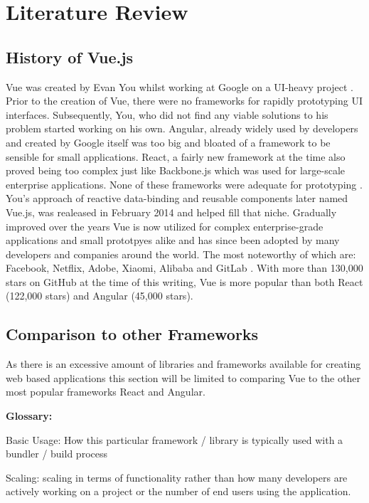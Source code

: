 \chapter[Literature Review]{Literature Review}

\section{History of Vue.js}
Vue was created by Evan You whilst working at Google on a UI-heavy project \cite{macrae2018vue}. Prior to the creation of Vue, there were no frameworks for rapidly prototyping UI interfaces. Subsequently, You, who did not find any viable solutions to his problem started working on his own. Angular, already widely used by developers and created by Google itself was too big and bloated of a framework to be sensible for small applications. React, a fairly new framework at the time also proved being too complex just like Backbone.js which was used for large-scale enterprise applications. None of these frameworks were adequate for prototyping \cite[p.~10]{filipova2016learning}. You's approach of reactive data-binding and reusable components later named Vue.js, was realeased in February 2014 \cite{macrae2018vue} and helped fill that niche. Gradually improved over the years Vue is now utilized for complex enterprise-grade applications and small prototpyes alike and has since been adopted by many developers and companies around the world. The most noteworthy of which are: Facebook, Netflix, Adobe, Xiaomi, Alibaba and GitLab \cite{CompaniesUsingVue:online}. With more than 130,000 stars on GitHub at the time of this writing, Vue is more popular than both React (122,000 stars) and Angular (45,000 stars).


\section{Comparison to other Frameworks}
As there is an excessive amount of libraries and frameworks available for creating web based applications this section will be limited to comparing Vue to the other most popular frameworks React and Angular.

\textbf{Glossary:}

Basic Usage: How this particular framework / library is typically used with a bundler / build process

Scaling: scaling in terms of functionality rather than how many developers are actively working on a project or the number of end users using the application. 

